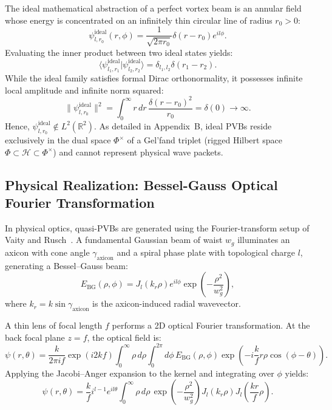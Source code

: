 \documentclass[11pt,a4paper]{article}
\begin{document}
The ideal mathematical abstraction of a perfect vortex beam is an annular field whose energy is concentrated on an infinitely thin circular line of radius $r_0 > 0$:
\begin{equation}
\psi_{l, r_0}^{\text{ideal}}(r, \phi) = \frac{1}{\sqrt{2\pi r_0}} \delta(r - r_0) e^{i l \phi}.
\label{eq:ideal_pvb}
\end{equation}
Evaluating the inner product between two ideal states yields:
\begin{equation}
\langle \psi_{l_1, r_1}^{\text{ideal}} | \psi_{l_2, r_2}^{\text{ideal}} \rangle = \delta_{l_1, l_2} \delta(r_1 - r_2).
\end{equation}
While the ideal family satisfies formal Dirac orthonormality, it possesses infinite local amplitude and infinite norm squared:
\begin{equation}
\|\psi_{l, r_0}^{\text{ideal}}\|^2 = \int_0^\infty r \, dr \, \frac{\delta(r - r_0)^2}{r_0} = \delta(0) \to \infty.
\end{equation}
Hence, $\psi_{l, r_0}^{\text{ideal}} \notin L^2(\mathbb{R}^2)$. As detailed in Appendix~B, ideal PVBs reside exclusively in the dual space $\Phi^\times$ of a Gel'fand triplet (rigged Hilbert space $\Phi \subset \mathcal{H} \subset \Phi^\times$) and cannot represent physical wave packets.

\subsection{Physical Realization: Bessel-Gauss Optical Fourier Transformation}

In physical optics, quasi-PVBs are generated using the Fourier-transform setup of Vaity and Rusch~\cite{Vaity2015}. A fundamental Gaussian beam of waist $w_g$ illuminates an axicon with cone angle $\gamma_{\text{axicon}}$ and a spiral phase plate with topological charge $l$, generating a Bessel--Gauss beam:
\begin{equation}
E_{\text{BG}}(\rho, \phi) = J_l(k_r \rho) e^{i l \phi} \exp\left( - \frac{\rho^2}{w_g^2} \right),
\end{equation}
where $k_r = k \sin \gamma_{\text{axicon}}$ is the axicon-induced radial wavevector.

A thin lens of focal length $f$ performs a 2D optical Fourier transformation. At the back focal plane $z = f$, the optical field is:
\begin{equation}
\psi(r, \theta) = \frac{k}{2\pi i f} \exp(i 2k f) \int_0^\infty \rho \, d\rho \int_0^{2\pi} d\phi \, E_{\text{BG}}(\rho, \phi) \exp\left( - i \frac{k}{f} r \rho \cos(\phi - \theta) \right).
\end{equation}
Applying the Jacobi--Anger expansion to the kernel and integrating over $\phi$ yields:
\begin{equation}
\psi(r, \theta) = \frac{k}{f} i^{l-1} e^{i l \theta} \int_0^\infty \rho \, d\rho \, \exp\left( - \frac{\rho^2}{w_g^2} \right) J_l(k_r \rho) J_l\left( \frac{k r}{f} \rho \right).
\end{equation}
\end{document}
